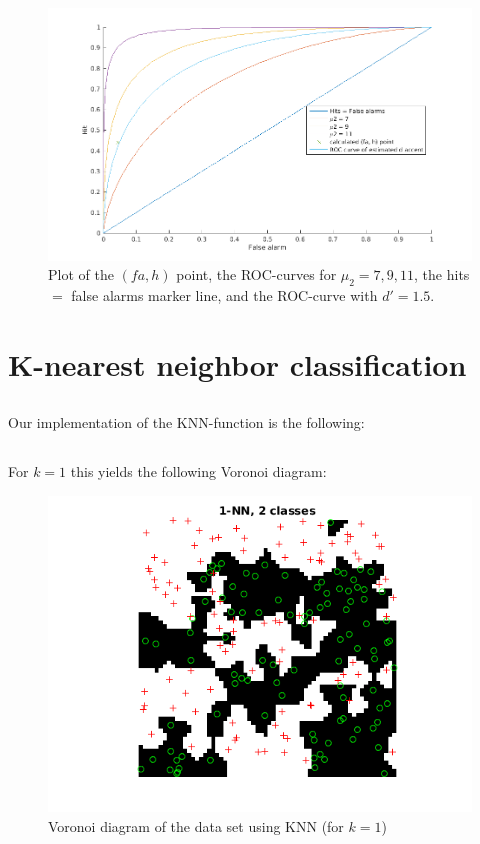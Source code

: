 \documentclass[10pt]{article}
\begin{document}
\begin{figure}[H]
 \centering
 \includegraphics[width=\textwidth]{assign1_2b.png}
 \caption{Plot of the $(fa, h)$ point, the ROC-curves for $\mu_2={7, 9, 11}$, the hits $=$ false alarms marker line, and the ROC-curve with $d'=1.5$.}
 \label{fig1.2}
\end{figure}

\section{K-nearest neighbor classification}
\subsection{}
Our implementation of the KNN-function is the following:


\subsection{}
For $k=1$ this yields the following Voronoi diagram:
\begin{figure}[H]
 \centering
 \includegraphics[width=\textwidth]{assign2_2_1.png}
 \caption{Voronoi diagram of the data set using KNN (for $k=1$)}
 \label{fig2.1a}
\end{figure}
\end{document}
